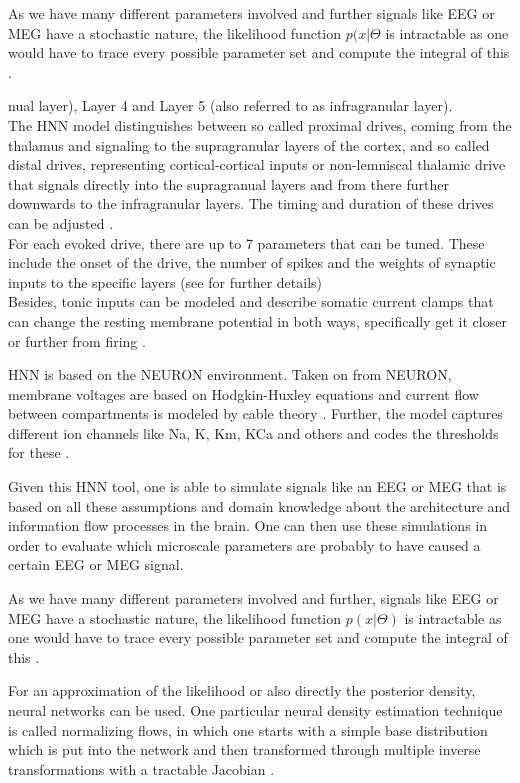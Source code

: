 \documentclass[12pt]{report}
\begin{document}
As we have many different parameters involved and further signals like EEG or MEG have a stochastic nature, the likelihood function $p(x|\Theta$ is intractable as one would have to trace every possible parameter set and compute the integral of this \citep{cranmer2020frontier}. 

nual layer), Layer 4 and Layer 5 (also referred to as infragranular layer). \\
The HNN model distinguishes between so called proximal drives, coming from the thalamus and signaling to the supragranular layers of the cortex, and so called distal drives, representing cortical-cortical inputs or non-lemniscal thalamic drive that signals directly into the supragranual layers and from there further downwards to the infragranular layers. The timing and duration of these drives can be adjusted \citep{neymotin2020human}. \\
For each evoked drive, there are up to 7 parameters that can be tuned. These include the onset of the drive, the number of spikes and the weights of synaptic inputs to the specific layers (see \cite{neymotin2020human} for further details)\\
Besides, tonic inputs can be modeled and describe somatic current clamps that can change the resting membrane potential in both ways, specifically get it closer or further from firing \citep{neymotin2020human}. 


HNN is based on the NEURON environment. Taken on from NEURON, membrane voltages are based on Hodgkin-Huxley equations and current flow between compartments is modeled by cable theory \citep{neymotin2020human}. 
Further, the model captures different ion channels like Na, K, Km, KCa and others and codes the thresholds for these \cite{neymotin2020human}. 

Given this HNN tool, one is able to simulate signals like an EEG or MEG that is based on all these assumptions and domain knowledge about the architecture and information flow processes in the brain. 
One can then use these simulations in order to evaluate which microscale parameters are probably to have caused a certain EEG or MEG signal. 

As we have many different parameters involved and further, signals like EEG or MEG have a stochastic nature, the likelihood function $p(x|\Theta)$ is intractable as one would have to trace every possible parameter set and compute the integral of this \citep{cranmer2020frontier}. 


For an approximation of the likelihood or also directly the posterior density, neural networks can be used. One particular neural density estimation technique is called normalizing flows, in which one starts with a simple base distribution which is put into the network and then transformed through multiple inverse transformations with a tractable Jacobian \citep{cranmer2020frontier}.
\end{document}
